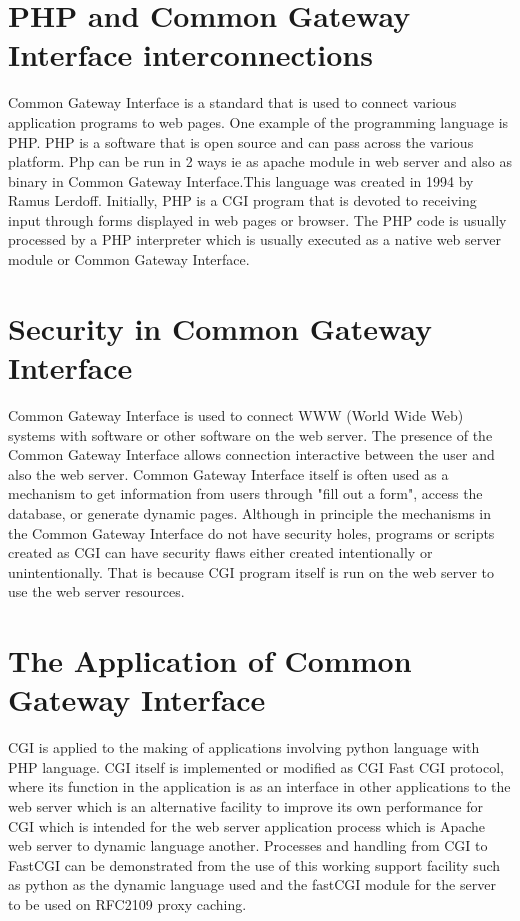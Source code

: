 \section{PHP and Common Gateway Interface interconnections }
Common Gateway Interface is a standard that is used to connect various application programs to web pages. One example of the programming language is PHP. PHP is a software that is open source and can pass across the various platform. Php can be run in 2 ways ie as apache module in web server and also as binary in Common Gateway Interface.This language was created in 1994 by Ramus Lerdoff.  Initially, PHP is a CGI program that is devoted to receiving input through forms displayed in web pages or browser. The PHP code is usually processed by a PHP interpreter which is usually executed as a native web server module or Common Gateway Interface\cite{nahado2015bumbu}.


\section{Security in Common Gateway Interface }
Common Gateway Interface is used to connect WWW (World Wide Web) systems with software or other software on the web server. The presence of the Common Gateway Interface allows connection interactive between the user and also the web server. Common Gateway Interface itself is often used as a mechanism to get information from users through "fill out a form", access the database, or generate dynamic pages. Although in principle the mechanisms in the Common Gateway Interface do not have security holes, programs or scripts created as CGI can have security flaws either created intentionally or unintentionally. That is because CGI program itself is run on the web server to use the web server resources.


\section{The Application of Common Gateway Interface }
CGI is applied to the making of applications involving python language with PHP language. CGI itself is implemented or modified as CGI Fast CGI protocol, where its function in the application is as an interface in other applications to the web server which is an alternative facility to improve its own performance for CGI which is intended for the web server application process which is Apache web server to dynamic language another. Processes and handling from CGI to FastCGI can be demonstrated from the use of this working support facility such as python as the dynamic language used and the fastCGI module for the server to be used on RFC2109 proxy caching.